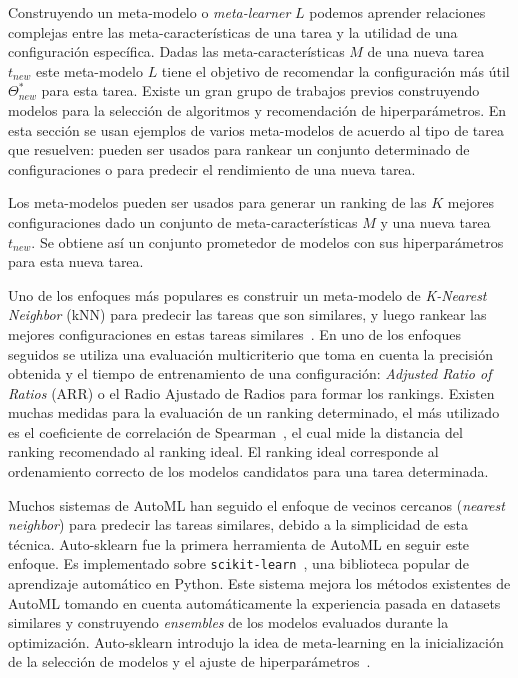 \documentclass[a4paper,10pt,twocolumn]{article}
\begin{document}
Construyendo un meta-modelo o \textit{meta-learner} $L$ podemos aprender relaciones complejas entre las meta-características de una tarea y la utilidad de una configuración específica. Dadas las meta-características $M$ de una nueva tarea $t_{new}$ este meta-modelo $L$ tiene el objetivo de recomendar la configuración más útil $\Theta_{new}^*$ para esta tarea. Existe un gran grupo de trabajos previos construyendo modelos para la selección de algoritmos y recomendación de hiperparámetros. En esta sección se usan ejemplos de varios meta-modelos de acuerdo al tipo de tarea que resuelven: pueden ser usados para rankear un conjunto determinado de configuraciones o para predecir el rendimiento de una nueva tarea.

Los meta-modelos pueden ser usados para generar un ranking de las $K$ mejores configuraciones dado un conjunto de meta-características $M$ y una nueva tarea $t_{new}$. Se obtiene así un conjunto prometedor de modelos con sus hiperparámetros para esta nueva tarea.
 
Uno de los enfoques más populares es construir un meta-modelo de \textit{K-Nearest Neighbor} (kNN) para predecir las tareas que son similares, y luego rankear las mejores configuraciones en estas tareas similares~\cite{santos2004selection, bradzil2003ranking}. En uno de los enfoques seguidos se utiliza una evaluación multicriterio que toma en cuenta la precisión obtenida y el tiempo de entrenamiento de una configuración: \textit{Adjusted Ratio of Ratios} (ARR) o el Radio Ajustado de Radios para formar los rankings. Existen muchas medidas para la evaluación de un ranking determinado, el más utilizado es el coeficiente de correlación de Spearman~\cite{santos2004selection}, el cual mide la distancia del ranking recomendado al ranking ideal. El ranking ideal corresponde al ordenamiento correcto de los modelos candidatos para una tarea determinada.

Muchos sistemas de AutoML han seguido el enfoque de vecinos cercanos (\textit{nearest neighbor}) para predecir las tareas similares, debido a la simplicidad de esta técnica. Auto-sklearn \cite{fuerer2015efficient} fue la primera herramienta de AutoML en seguir este enfoque. Es implementado sobre \texttt{scikit-learn}~\cite{scikit-learn}, una biblioteca popular de aprendizaje automático en Python. 
Este sistema mejora los métodos existentes de AutoML tomando en cuenta automáticamente la experiencia pasada en datasets similares y construyendo \textit{ensembles} de los modelos evaluados durante la optimización. Auto-sklearn introdujo la idea de meta-learning en la inicialización de la selección de modelos y el ajuste de hiperparámetros~\cite{vanschoren2018metalearning}.
\end{document}
